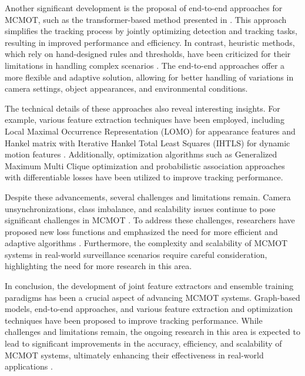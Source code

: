 \documentclass[conference]{IEEEtran}
\begin{document}
Another significant development is the proposal of end-to-end approaches for MCMOT, such as the transformer-based method presented in \cite{MCTR: Multi Camera Tracking Transformer}. This approach simplifies the tracking process by jointly optimizing detection and tracking tasks, resulting in improved performance and efficiency. In contrast, heuristic methods, which rely on hand-designed rules and thresholds, have been criticized for their limitations in handling complex scenarios \cite{Challenge of Multi-Camera Tracking}. The end-to-end approaches offer a more flexible and adaptive solution, allowing for better handling of variations in camera settings, object appearances, and environmental conditions.

The technical details of these approaches also reveal interesting insights. For example, various feature extraction techniques have been employed, including Local Maximal Occurrence Representation (LOMO) for appearance features and Hankel matrix with Iterative Hankel Total Least Squares (IHTLS) for dynamic motion features \cite{An equalised global graphical model-based approach for multi-camera object tracking}. Additionally, optimization algorithms such as Generalized Maximum Multi Clique optimization \cite{Multi-camera Multi-Object Tracking} and probabilistic association approaches with differentiable losses \cite{MCTR: Multi Camera Tracking Transformer} have been utilized to improve tracking performance.

Despite these advancements, several challenges and limitations remain. Camera unsynchronizations, class imbalance, and scalability issues continue to pose significant challenges in MCMOT \cite{Graph Convolutional Network for Multi-Target Multi-Camera Vehicle Tracking, Challenge of Multi-Camera Tracking}. To address these challenges, researchers have proposed new loss functions \cite{Graph Convolutional Network for Multi-Target Multi-Camera Vehicle Tracking} and emphasized the need for more efficient and adaptive algorithms \cite{Challenge of Multi-Camera Tracking}. Furthermore, the complexity and scalability of MCMOT systems in real-world surveillance scenarios require careful consideration, highlighting the need for more research in this area.

In conclusion, the development of joint feature extractors and ensemble training paradigms has been a crucial aspect of advancing MCMOT systems. Graph-based models, end-to-end approaches, and various feature extraction and optimization techniques have been proposed to improve tracking performance. While challenges and limitations remain, the ongoing research in this area is expected to lead to significant improvements in the accuracy, efficiency, and scalability of MCMOT systems, ultimately enhancing their effectiveness in real-world applications \cite{MCTR: Multi Camera Tracking Transformer, An equalised global graphical model-based approach for multi-camera object tracking}.
\end{document}
